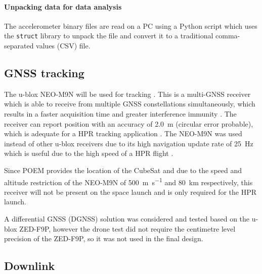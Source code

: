 \documentclass{report}
\begin{document}
\paragraph{Unpacking data for data analysis}

The accelerometer binary files are read on a PC using a Python script which uses the \texttt{struct} library to unpack the file and convert it to a traditional comma-separated values (CSV) file.

\subsection{GNSS tracking}

The u-blox NEO-M9N will be used for tracking \cite{ublox2023neo_m9n_datasheet}. This is a multi-GNSS receiver which is able to receive from multiple GNSS constellations simultaneously, which results in a faster acquisition time and greater interference immunity \cite{ublox2023neo_m9n_datasheet}. The receiver can report position with an accuracy of \SI{2.0}{\metre} (circular error probable), which is adequate for a HPR tracking application \cite{ublox2023neo_m9n_datasheet}. The NEO-M9N was used instead of other u-blox receivers due to its high navigation update rate of \SI{25}{\hertz} which is useful due to the high speed of a HPR flight \cite{ublox2023neo_m9n_datasheet}.

Since POEM provides the location of the CubeSat and due to the speed and altitude restriction of the NEO-M9N of \SI{500}{\metre\per\second} and \SI{80}{\kilo\metre} respectively, this receiver will not be present on the space launch and is only required for the HPR launch.

A differential GNSS (DGNSS) solution was considered and tested based on the u-blox ZED-F9P, however the drone test did not require the centimetre level precision of the ZED-F9P, so it was not used in the final design.


\subsection{Downlink}



\end{document}
